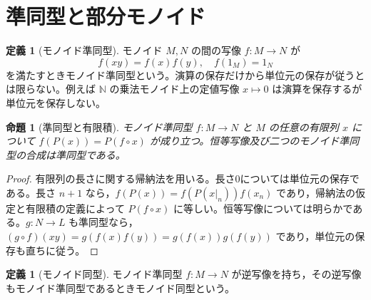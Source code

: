 \documentclass[a5paper,10pt,dvipdfmx]{jsarticle}
\theoremstyle{definition}
\newtheorem{defn}[ruledef]{定義}
\theoremstyle{plain}
\newtheorem{prop}[ruledef]{命題}
\begin{document}
\section{準同型と部分モノイド}
\begin{defn}[モノイド準同型]\label{k170}
モノイド $M,N$ の間の写像 $f\colon M\to N$ が
\[f(xy)=f(x)f(y),\quad f(1_M)=1_N\]
を満たすときモノイド準同型という。演算の保存だけから単位元の保存が従うとは限らない。例えば $\mathbb N$ の乗法モノイド上の定値写像 $x\mapsto0$ は演算を保存するが単位元を保存しない。
\end{defn}
\begin{prop}[準同型と有限積]\label{k171}
モノイド準同型 $f\colon M\to N$ と $M$ の任意の有限列 $x$ について $f(P(x))=P(f\circ x)$ が成り立つ。恒等写像及び二つのモノイド準同型の合成は準同型である。
\end{prop}
\begin{proof}
有限列の長さに関する帰納法を用いる。長さ0については単位元の保存である。長さ $n+1$ なら，$f(P(x))=f(P(x|_n))f(x_n)$ であり，帰納法の仮定と有限積の定義によって $P(f\circ x)$ に等しい。恒等写像については明らかである。$g\colon N\to L$ も準同型なら，$(g\circ f)(xy)=g(f(x)f(y))=g(f(x))g(f(y))$ であり，単位元の保存も直ちに従う。
\end{proof}
\begin{defn}[モノイド同型]\label{k172}
モノイド準同型 $f\colon M\to N$ が逆写像を持ち，その逆写像もモノイド準同型であるときモノイド同型という。
\end{defn}
\end{document}
